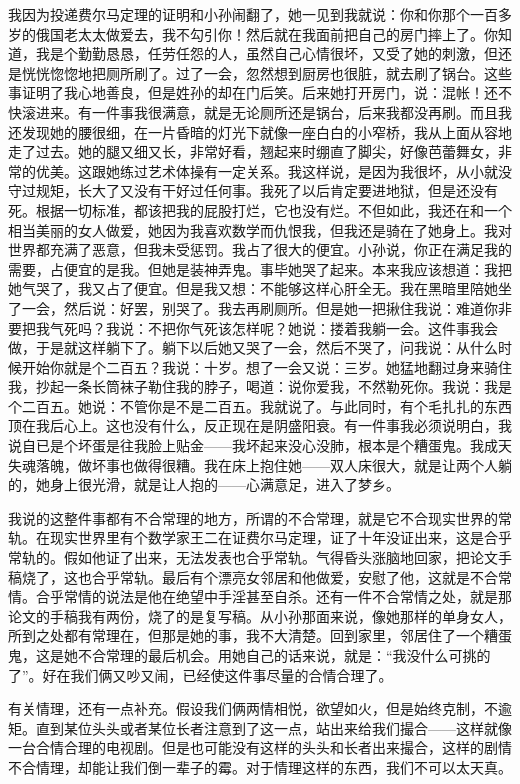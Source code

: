 我因为投递费尔马定理的证明和小孙闹翻了，她一见到我就说：你和你那个一百多岁的俄国老太太做爱去，我不勾引你！然后就在我面前把自己的房门摔上了。你知道，我是个勤勤恳恳，任劳任怨的人，虽然自己心情很坏，又受了她的刺激，但还是恍恍惚惚地把厕所刷了。过了一会，忽然想到厨房也很脏，就去刷了锅台。这些事证明了我心地善良，但是姓孙的却在门后笑。后来她打开房门，说：混帐！还不快滚进来。有一件事我很满意，就是无论厕所还是锅台，后来我都没再刷。而且我还发现她的腰很细，在一片昏暗的灯光下就像一座白白的小窄桥，我从上面从容地走了过去。她的腿又细又长，非常好看，翘起来时绷直了脚尖，好像芭蕾舞女，非常的优美。这跟她练过艺术体操有一定关系。我这样说，是因为我很坏，从小就没守过规矩，长大了又没有干好过任何事。我死了以后肯定要进地狱，但是还没有死。根据一切标准，都该把我的屁股打烂，它也没有烂。不但如此，我还在和一个相当美丽的女人做爱，她因为我喜欢数学而仇恨我，但我还是骑在了她身上。我对世界都充满了恶意，但我未受惩罚。我占了很大的便宜。小孙说，你正在满足我的需要，占便宜的是我。但她是装神弄鬼。事毕她哭了起来。本来我应该想道：我把她气哭了，我又占了便宜。但是我又想：不能够这样心肝全无。我在黑暗里陪她坐了一会，然后说：好罢，别哭了。我去再刷厕所。但是她一把揪住我说：难道你非要把我气死吗？我说：不把你气死该怎样呢？她说：搂着我躺一会。这件事我会做，于是就这样躺下了。躺下以后她又哭了一会，然后不哭了，问我说：从什么时候开始你就是个二百五？我说：十岁。想了一会又说：三岁。她猛地翻过身来骑住我，抄起一条长筒袜子勒住我的脖子，喝道：说你爱我，不然勒死你。我说：我是个二百五。她说：不管你是不是二百五。我就说了。与此同时，有个毛扎扎的东西顶在我后心上。这也没有什么，反正现在是阴盛阳衰。有一件事我必须说明白，我说自已是个坏蛋是往我脸上贴金——我坏起来没心没肺，根本是个糟蛋鬼。我成天失魂落魄，做坏事也做得很糟。我在床上抱住她——双人床很大，就是让两个人躺的，她身上很光滑，就是让人抱的——心满意足，进入了梦乡。 

我说的这整件事都有不合常理的地方，所谓的不合常理，就是它不合现实世界的常轨。在现实世界里有个数学家王二在证费尔马定理，证了十年没证出来，这是合乎常轨的。假如他证了出来，无法发表也合乎常轨。气得昏头涨脑地回家，把论文手稿烧了，这也合乎常轨。最后有个漂亮女邻居和他做爱，安慰了他，这就是不合常情。合乎常情的说法是他在绝望中手淫甚至自杀。还有一件不合常情之处，就是那论文的手稿我有两份，烧了的是复写稿。从小孙那面来说，像她那样的单身女人，所到之处都有常理在，但那是她的事，我不大清楚。回到家里，邻居住了一个糟蛋鬼，这是她不合常理的最后机会。用她自己的话来说，就是：“我没什么可挑的了”。好在我们俩又吵又闹，已经使这件事尽量的合情合理了。 

有关情理，还有一点补充。假设我们俩两情相悦，欲望如火，但是始终克制，不逾矩。直到某位头头或者某位长者注意到了这一点，站出来给我们撮合——这样就像一台合情合理的电视剧。但是也可能没有这样的头头和长者出来撮合，这样的剧情不合情理，却能让我们倒一辈子的霉。对于情理这样的东西，我们不可以太天真。 

